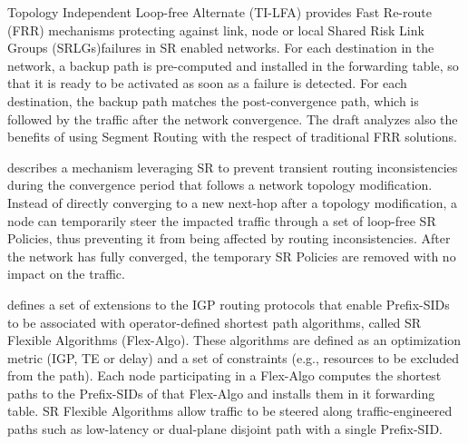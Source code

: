 Topology Independent Loop-free Alternate (TI-LFA) \cite{id-segment-routing-ti-lfa} provides Fast Re-route (FRR) mechanisms protecting against link, node or local Shared Risk Link Groups (SRLGs)failures in SR enabled networks. For each destination in the network, a backup path is pre-computed and installed in the forwarding table, so that it is ready to be activated as soon as a failure is detected. For each destination, the backup path matches the post-convergence path, which is followed by the traffic after the network convergence. The draft analyzes also the benefits of using Segment Routing with the respect of traditional FRR solutions.

\cite{id-segment-routing-uloop} describes a mechanism leveraging SR to prevent transient routing inconsistencies during the convergence period that follows a network topology modification. Instead of directly converging to a new next-hop after a topology modification, a node can temporarily steer the impacted traffic through a set of loop-free SR Policies, thus preventing it from being affected by routing inconsistencies. After the network has fully converged, the temporary SR Policies are removed with no impact on the traffic.

\cite{ietf-lsr-flex-algo} defines a set of extensions to the IGP routing protocols that enable Prefix-SIDs to be associated with operator-defined shortest path algorithms, called SR Flexible Algorithms (Flex-Algo). These algorithms are defined as an optimization metric (IGP, TE or delay) and a set of constraints (e.g., resources to be excluded from the path). Each node participating in a Flex-Algo computes the shortest paths to the Prefix-SIDs of that Flex-Algo and installs them in it forwarding table. SR Flexible Algorithms allow traffic to be steered along traffic-engineered paths such as low-latency or dual-plane disjoint path with a single Prefix-SID.


